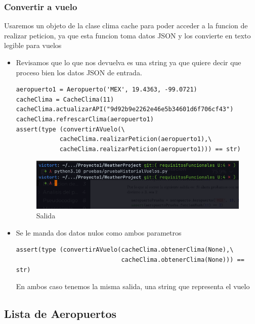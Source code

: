 \documentclass[12pt]{article}
\begin{document}
\subsubsection{Convertir a vuelo}
Usaremos un objeto de la clase clima cache para poder acceder a la funcion de realizar peticion, ya que esta funcion toma datos JSON y los convierte en texto legible para vuelos
\begin{itemize}
\item Revisamos que lo que nos devuelva es una string ya que quiere decir que proceso bien los datos JSON de entrada.
\begin{verbatim}
aeropuerto1 = Aeropuerto('MEX', 19.4363, -99.0721)
cacheClima = CacheClima(11)
cacheClima.actualizarAPI("9d92b9e2262e46e5b34601d6f706cf43")
cacheClima.refrescarClima(aeropuerto1)
assert(type (convertirAVuelo(\
            cacheClima.realizarPeticion(aeropuerto1),\
            cacheClima.realizarPeticion(aeropuerto1))) == str)
\end{verbatim}
\begin{figure}[h!]
    \centering
    \includegraphics[scale=0.7]{pruebasPy/historial/bien.png}
    \caption{Salida}
  \end{figure}
\item Se le manda dos datos nulos como ambos parametros

\begin{verbatim}
assert(type (convertirAVuelo(cacheClima.obtenerClima(None),\
                             cacheClima.obtenerClima(None))) == str)
\end{verbatim}
  En ambos caso tenemos la misma salida, una string que representa el vuelo
\end{itemize}
\subsection{Lista de Aeropuertos}
\end{document}
